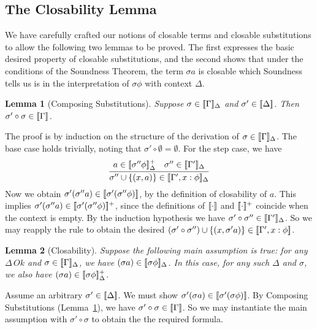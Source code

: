\documentclass[copyright]{eptcs}
\newtheorem{lemma}{Lemma}
\newcommand{\interp}[1]{[\negthinspace[#1]\negthinspace]}
\begin{document}
\subsection{The Closability Lemma}

We have carefully crafted our notions of closable terms and closable
substitutions to allow the following two lemmas to be proved.  The
first expresses the basic desired property of closable substitutions,
and the second shows that under the conditions of the Soundness
Theorem, the term $\sigma a$ is closable which Soundness tells us is
in the interpretation of $\sigma\phi$ with context $\Delta$.

\begin{lemma}[Composing Substitutions]
\label{lem:csubst}
Suppose $\sigma\in\interp{\Gamma}_{\Delta}$ and
$\sigma'\in\interp{\Delta}$.  Then
$\sigma'\circ\sigma\in\interp{\Gamma}$.
\end{lemma}

\noindent The proof is by induction on the
structure of the derivation of
$\sigma\in\interp{\Gamma}_{\Delta}$.  The base case
holds trivially, noting that $\sigma'\circ\emptyset = \emptyset$.  For
the step case, we have
\[
\infer{\sigma''\cup\{(x,a)\}\in\interp{\Gamma',x:\phi}_{\Delta}}
      {a\in\interp{\sigma''\phi}^+_{\Delta} & \sigma'' \in\interp{\Gamma'}_{\Delta}}
\]
\noindent Now we obtain
$\sigma'(\sigma''a)\in\interp{\sigma'(\sigma''\phi)}$, by the
definition of closability of $a$.  This implies
$\sigma'(\sigma''a)\in\interp{\sigma'(\sigma''\phi)}^+$, since the
definitions of $\interp{\cdot}$ and $\interp{\cdot}^+$ coincide when
the context is empty.  By the induction hypothesis we have
$\sigma'\circ\sigma'' \in\interp{\Gamma'}_{\Delta}$.  So we may
reapply the rule to obtain the desired
$(\sigma'\circ\sigma'')\cup\{(x,\sigma'
a)\}\in\interp{\Gamma',x:\phi}$.

\begin{lemma}[Closability]
\label{lem:close} Suppose the following main assumption is true: for any $\Delta\,\textit{Ok}$
and $\sigma\in\interp{\Gamma}_{\Delta}$, we have $(\sigma
a)\in\interp{\sigma \phi}_{\Delta}$.  In this case, for any such
$\Delta$ and $\sigma$, we also have $(\sigma a)\in\interp{\sigma
  \phi}^+_{\Delta}$.
\end{lemma}

\noindent Assume an arbitrary $\sigma'\in\interp{\Delta}$.  We must
show $\sigma'(\sigma a)\in\interp{\sigma'(\sigma\phi)}$.  By Composing
Substitutions (Lemma~\ref{lem:csubst}), we have
$\sigma'\circ\sigma\in\interp{\Gamma}$.  So we may instantiate the
main assumption with $\sigma'\circ\sigma$ to obtain the the required
formula.
\end{document}
